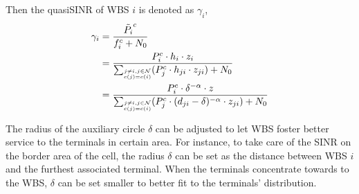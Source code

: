 Then the quasiSINR of WBS $i$ is denoted as $\gamma_{i}$, 
\begin{equation}
\label{quasiSINR}
\begin{aligned}
 \gamma_{i} & = \frac{\tilde{P_i}^c}{f_i^c + N_0} \\
&=\frac{P_{i}^c \cdot h_i \cdot z_i} {\sum_{\tiny\substack{j\neq i, j\in \mathcal{N}\\c(j)=c(i)}} (P_j^c \cdot h_{ji} \cdot z_{ji}) + N_0}\\
&= \frac{P_{i}^c \cdot \delta^{-\alpha}\cdot z} {\sum_{\tiny\substack{j\neq i, j\in \mathcal{N}\\c(j)=c(i)}} (P_j^c \cdot (d_{ji}-\delta)^{-\alpha} \cdot z_{ji}) + N_0}
\end{aligned}
\end{equation}



The radius of the auxiliary circle $\delta$ can be adjusted to let WBS foster better service to the terminals in certain area.
For instance, to take care of the SINR on the border area of the cell, the radius $\delta$ can be set as the distance between WBS $i$ and the furthest associated terminal.
When the terminals concentrate towards to the WBS, $\delta$ can be set smaller to better fit to the terminals' distribution.




